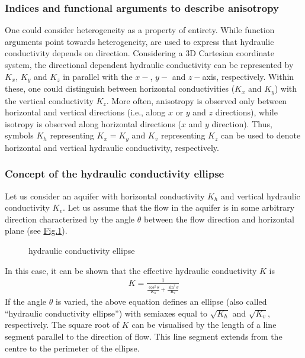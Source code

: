 \documentclass[letterpaper,10pt,english]{sphinxmanual}
\begin{document}
\subsubsection{Indices and functional arguments to describe anisotropy}
\label{\detokenize{contents/flow/lecture_05/15_het_iso:indices-and-functional-arguments-to-describe-anisotropy}}
One could consider heterogeneity as a property of entirety. While function arguments point towards heterogeneity,  are
used to express that hydraulic conductivity depends on direction. Considering a 3\sphinxhyphen{}D Cartesian coordinate system, the directional dependent hydraulic conductivity can be represented by \(K_x\), \(K_y\) and \(K_z\) in parallel with the \(x-\), \(y-\) and \(z-\)axis, respectively. Within these, one could distinguish between horizontal conductivities (\(K_x\) and \(K_y\)) with the vertical conductivity \(K_z\). More often, anisotropy is observed only between horizontal and vertical directions (i.e., along \(x\) or \(y\) and \(z\) directions), while isotropy is observed along horizontal directions (\(x\) and \(y\) direction). Thus, symbols \(K_h\) representing \(K_x = K_y\) and \(K_v\) representing \(K_z\) can be used to denote horizontal and vertical hydraulic conductivity, respectively.


\subsubsection{Concept of the hydraulic conductivity ellipse}
\label{\detokenize{contents/flow/lecture_05/15_het_iso:concept-of-the-hydraulic-conductivity-ellipse}}
Let us consider an aquifer with horizontal conductivity \(K_h\) and vertical hydraulic conductivity \(K_v\). Let us assume that the flow in the aquifer is in some arbitrary direction characterized by the angle \(\theta\) between the flow direction and horizontal plane (see \hyperref[\detokenize{contents/flow/lecture_05/15_het_iso:k-ellipse}]{Fig.\@ \ref{\detokenize{contents/flow/lecture_05/15_het_iso:k-ellipse}}}).

\begin{figure}[htbp]
\centering
\capstart

\noindent{}
\caption{hydraulic conductivity ellipse}\label{\detokenize{contents/flow/lecture_05/15_het_iso:k-ellipse}}\end{figure}

In this case, it can be shown that the effective hydraulic conductivity \(K\) is
\begin{equation*}
\begin{split}
K = \frac{1}{\frac{\cos^2\theta}{K_h}+\frac{\sin^2\theta}{K_v}} 
\end{split}
\end{equation*}
If the angle \(\theta\) is varied, the above equation defines an ellipse (also called “hydraulic conductivity ellipse”) with semi\sphinxhyphen{}axes equal to \(\surd{K_h}\) and \(\surd{K_v}\), respectively. The square root of \(K\) can be visualised by the length of a line segment parallel to the direction of flow. This line segment extends from the centre to the perimeter of the ellipse.
\end{document}
